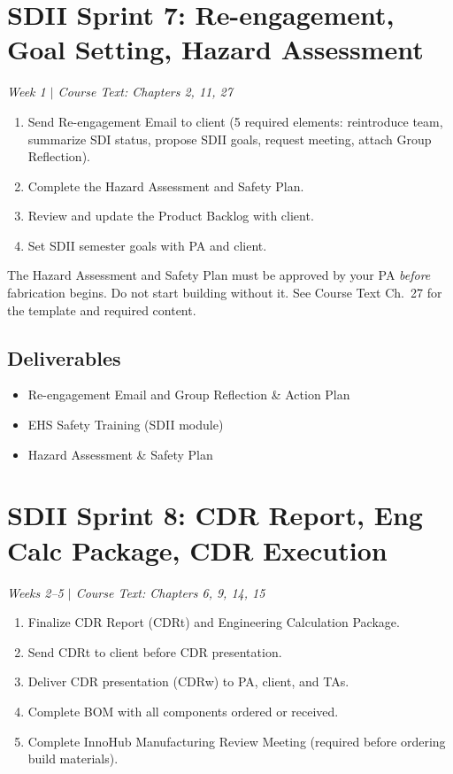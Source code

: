 \documentclass[11pt,letterpaper]{article}
\begin{document}
\section{SDII Sprint 7: Re-engagement, Goal Setting, Hazard Assessment}
\textit{Week 1 $|$ Course Text: Chapters 2, 11, 27}

\begin{priorities}
\begin{enumerate}[nosep]
\item Send Re-engagement Email to client (5 required elements: reintroduce team, summarize SDI status, propose SDII goals, request meeting, attach Group Reflection).
\item Complete the Hazard Assessment and Safety Plan.
\item Review and update the Product Backlog with client.
\item Set SDII semester goals with PA and client.
\end{enumerate}
\end{priorities}

\begin{warnbox}
The Hazard Assessment and Safety Plan must be approved by your PA \emph{before} fabrication begins. Do not start building without it. See Course Text Ch.~27 for the template and required content.
\end{warnbox}

\subsection{Deliverables}
\begin{itemize}[nosep,leftmargin=1.5em]
\item Re-engagement Email and Group Reflection \& Action Plan
\item EHS Safety Training (SDII module)
\item Hazard Assessment \& Safety Plan
\end{itemize}


\section{SDII Sprint 8: CDR Report, Eng Calc Package, CDR Execution}
\textit{Weeks 2--5 $|$ Course Text: Chapters 6, 9, 14, 15}

\begin{priorities}
\begin{enumerate}[nosep]
\item Finalize CDR Report (CDRt) and Engineering Calculation Package.
\item Send CDRt to client before CDR presentation.
\item Deliver CDR presentation (CDRw) to PA, client, and TAs.
\item Complete BOM with all components ordered or received.
\item Complete InnoHub Manufacturing Review Meeting (required before ordering build materials).
\end{enumerate}
\end{priorities}
\end{document}
